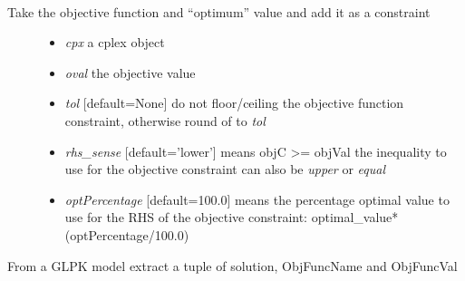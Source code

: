 \documentclass[a4paper,11pt,english]{sphinxmanual}
\begin{document}

\begin{fulllineitems}
\label{modules_doc:cbmpy.CBGLPK.glpk_func_SetObjectiveFunctionAsConstraint}~\begin{description}
\item[{Take the objective function and ``optimum'' value and add it as a constraint}] \leavevmode\begin{itemize}
\item {} 
\emph{cpx} a cplex object

\item {} 
\emph{oval} the objective value

\item {} 
\emph{tol}  {[}default=None{]} do not floor/ceiling the objective function constraint, otherwise round of to \emph{tol}

\item {} 
\emph{rhs\_sense} {[}default='lower'{]} means objC \textgreater{}= objVal the inequality to use for the objective constraint can also be \emph{upper} or \emph{equal}

\item {} 
\emph{optPercentage} {[}default=100.0{]} means the percentage optimal value to use for the RHS of the objective constraint: optimal\_value*(optPercentage/100.0)

\end{itemize}

\end{description}

\end{fulllineitems}


\begin{fulllineitems}
\label{modules_doc:cbmpy.CBGLPK.glpk_getOptimalSolution}
From a GLPK model extract a tuple of solution, ObjFuncName and ObjFuncVal

\end{fulllineitems}

\end{document}
